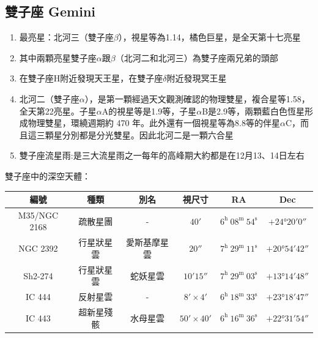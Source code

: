 \subsection{雙子座 Gemini}
\begin{enumerate}
    \item 最亮星：北河三（雙子座\(\beta\)），視星等為1.14，橘色巨星，是全天第十七亮星
    \item 其中兩顆亮星雙子座\(\alpha\)跟\(\beta\)（北河二和北河三）為雙子座兩兄弟的頭部
    \item 在雙子座H附近發現天王星，在雙子座\(\delta\)附近發現冥王星
    \item 北河二（雙子座\(\alpha\)），是第一顆經過天文觀測確認的物理雙星，複合星等1.58，全天第22亮星。子星\(\alpha\)A的視星等是1.9等，子星\(\alpha\)B是2.9等，兩顆藍白色恆星形成物理雙星，環繞週期約 470 年。此外還有一個視星等為8.8等的伴星\(\alpha\)C，而且這三顆星分別都是分光雙星。因此北河二是一顆六合星
    \item 雙子座流星雨:是三大流星雨之一每年的高峰期大約都是在12月13、14日左右
\end{enumerate}
雙子座中的深空天體：

\begin{center}
\begin{longtable}{c | c | c | c | c | c}
    編號 & 種類 & 別名 & 視尺寸 & RA & Dec \\
    \hline
    \endfirsthead


    \endfoot

    \endlastfoot

    M35/NGC 2168 & 疏散星團 & - & \(\ang{;40;}\) & \(6^\text{h }08^\text{m }54^\text{s}\) & \(+\ang{24;20;0}\) \\
    NGC 2392 & 行星狀星雲 & 愛斯基摩星雲 & \(\ang{;;20}\) & \(7^\text{h }29^\text{m }11^\text{s}\) & \(+\ang{20;54;42}\) \\
    Sh2-274 & 行星狀星雲 & 蛇妖星雲 & \(\ang{;10;15}\) & \(7^\text{h }29^\text{m }03^\text{s}\) & \(+\ang{13;14;48}\) \\
    IC 444 & 反射星雲 & - & \(\ang{;8;}\times\ang{;4;}\) & \(6^\text{h }18^\text{m }33^\text{s}\) & \(+\ang{23;18;47}\) \\
    IC 443 & 超新星殘骸 & 水母星雲 & \(\ang{;50;}\times\ang{;40;}\) & \(6^\text{h }16^\text{m }36^\text{s}\) & \(+\ang{22;31;54}\)
\end{longtable}
\end{center}

